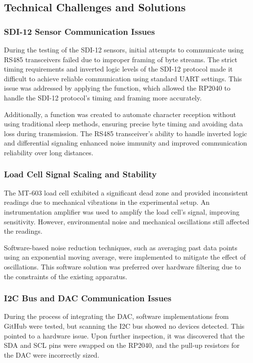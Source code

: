 \subsection{Technical Challenges and Solutions}

\subsubsection{SDI-12 Sensor Communication Issues}
During the testing of the SDI-12 sensors, initial attempts to communicate using RS485 transceivers failed due to improper framing of byte streams. The strict timing requirements and inverted logic levels of the SDI-12 protocol made it difficult to achieve reliable communication using standard UART settings. This issue was addressed by applying the  function, which allowed the RP2040 to handle the SDI-12 protocol's timing and framing more accurately.

Additionally, a  function was created to automate character reception without using traditional sleep methods, ensuring precise byte timing and avoiding data loss during transmission. The RS485 transceiver's ability to handle inverted logic and differential signaling enhanced noise immunity and improved communication reliability over long distances.

\subsubsection{Load Cell Signal Scaling and Stability}
The MT-603 load cell exhibited a significant dead zone and provided inconsistent readings due to mechanical vibrations in the experimental setup. An instrumentation amplifier was used to amplify the load cell's signal, improving sensitivity. However, environmental noise and mechanical oscillations still affected the readings.

Software-based noise reduction techniques, such as averaging past data points using an exponential moving average, were implemented to mitigate the effect of oscillations. This software solution was preferred over hardware filtering due to the constraints of the existing apparatus.

\subsubsection{I2C Bus and DAC Communication Issues}
During the process of integrating the DAC, software implementations from GitHub were tested, but scanning the I2C bus showed no devices detected. This pointed to a hardware issue. Upon further inspection, it was discovered that the SDA and SCL pins were swapped on the RP2040, and the pull-up resistors for the DAC were incorrectly sized.

